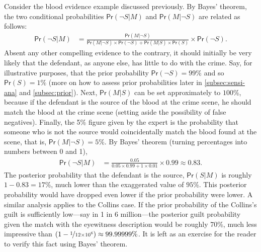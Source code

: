 \documentclass{article}
\newcommand{\pr}{\mathsf{Pr}}
\begin{document}
Consider the blood evidence example discussed previously. By Bayes' theorem, the two conditional probabilities $\pr(\neg S \vert M)$ and $\pr(M \vert \neg S)$ are related as follows:
%
\begin{align*} \pr(\neg S \vert M) & =  \frac{\pr(M \vert \neg S)}{ \pr(M \vert \neg S)\times \pr(\neg S)+ \pr(M \vert S)\times \pr(S)} \times \pr(\neg S).\end{align*}
%
Absent any  other compelling evidence to the contrary, it should initially be very likely that the defendant, as anyone else, has little to do with the crime. Say, for illustrative purposes, that the prior probability  $\pr(\neg S)= 99\%$ and  so $\pr(S)=1\%$ (more on how to assess prior probabilities later in \ref{subsec:sensi-ana} and \ref{subsec:prior}). Next, $\pr(M \vert S)$ can be set approximately  to $100\%$, because if the defendant is the source of the blood at the crime scene, he should match the blood at the crime scene (setting aside the possibility of false negatives). Finally, the 5\% figure given by the expert is the probability that someone who is not the source would coincidentally match the blood found at the scene, that is, $\pr(M \vert \neg S)=5\%$. By Bayes' theorem (turning percentages into numbers between 0 and 1),
%
\begin{align*} \pr(\neg S \vert M) & = \frac{0.05}{ 0.05 \times 0.99+ 1 \times 0.01} \times 0.99 \approx 0.83. \end{align*}
%
\noindent The posterior probability that  the defendant is the source, $\pr(S\vert M)$ is  roughly $1-0.83=17\%$, much lower than the exaggerated value of $95\%$. This posterior probability would have dropped even lower if the prior probability were lower. 
%
A similar analysis applies to the  Collins case. If the prior probability of the Collins's guilt is sufficiently low---say in 1 in 6 million---the posterior guilt probability given  the match with the eyewitness description would be roughly 70\%, much less impressive than $(1-\nicefrac{1}{12\times 10^6})\approx 99.99999\%$. %
It is left as an exercise for the reader to verify this fact using Bayes' theorem. 
\end{document}
